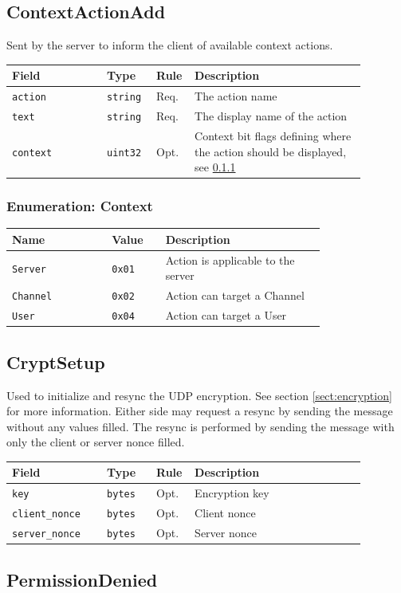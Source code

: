 \documentclass[11pt]{article} %
\newenvironment{mumbleMessageEx}
{%
	\small
	\renewcommand\arraystretch{1.5}
	\begin{tabular}{p{0.25\linewidth}p{0.13\linewidth}p{0.05\linewidth}p{0.45\linewidth}}
	Field & Type & Rule & Description \\
	\hline
}
{%
	\end{tabular}
	\renewcommand\arraystretch{1.0}
}
\newcommand{\mumbleMessageExItem}[4]{ \texttt{#1} & \texttt{#2} & #3 & #4 \\ }
\newenvironment{mumbleEnum}
{%
	\small
	\renewcommand\arraystretch{1.5}
	\begin{tabular}{p{0.25\linewidth}p{0.13\linewidth}p{0.4\linewidth}}
	Name & Value & Description \\
	\hline
}
{%
	\end{tabular}
	\renewcommand\arraystretch{1.0}
}
\newcommand{\mumbleEnumItem}[3]{ \texttt{#1} & \texttt{#2} & #3 \\ }
\begin{document}
\subsection{ContextActionAdd}
\label{msg:contextActionAdd}

Sent by the server to inform the client of available context actions.

\begin{mumbleMessageEx}
\mumbleMessageExItem{action}{string}{Req.}{The action name}
\mumbleMessageExItem{text}{string}{Req.}{The display name of the action}
\mumbleMessageExItem{context}{uint32}{Opt.}{Context bit flags defining where the action should be displayed, see \ref{msg:contextActionAdd:context}}
\end{mumbleMessageEx}

\subsubsection{Enumeration: Context}
\label{msg:contextActionAdd:context}

\begin{mumbleEnum}
\mumbleEnumItem{Server}{0x01}{Action is applicable to the server}
\mumbleEnumItem{Channel}{0x02}{Action can target a Channel}
\mumbleEnumItem{User}{0x04}{Action can target a User}
\end{mumbleEnum}

\subsection{CryptSetup}
\label{msg:cryptSetup}

Used to initialize and resync the UDP encryption. See section \ref{sect:encryption} for more information. Either side may request a resync by sending the message without any values filled. The resync is performed by sending the message with only the client or server nonce filled.

\begin{mumbleMessageEx}
\mumbleMessageExItem{key}{bytes}{Opt.}{Encryption key}
\mumbleMessageExItem{client\_nonce}{bytes}{Opt.}{Client nonce}
\mumbleMessageExItem{server\_nonce}{bytes}{Opt.}{Server nonce}
\end{mumbleMessageEx}

\subsection{PermissionDenied}
\label{msg:permissionDenied}
\end{document}
